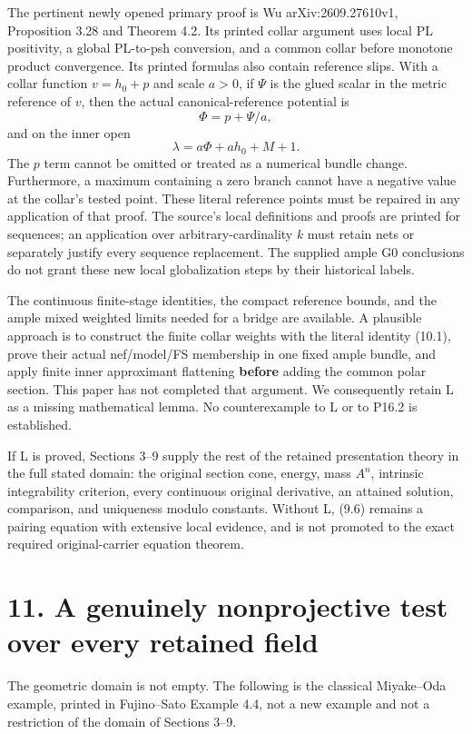 \documentclass[
  10pt,
]{article}
\begin{document}
The pertinent newly opened primary proof is Wu arXiv:2609.27610v1,
Proposition 3.28 and Theorem 4.2. Its printed collar argument uses local
PL positivity, a global PL-to-psh conversion, and a common collar before
monotone product convergence. Its printed formulas also contain
reference slips. With a collar function \(v=h_0+p\) and scale \(a>0\),
if \(\Psi\) is the glued scalar in the metric reference of \(v\), then
the actual canonical-reference potential is \[\Phi=p+\Psi/a,\] and on
the inner open
\[\lambda=a\Phi+a h_0+M+1.                              \tag{10.1}\] The
\(p\) term cannot be omitted or treated as a numerical bundle change.
Furthermore, a maximum containing a zero branch cannot have a negative
value at the collar's tested point. These literal reference points must
be repaired in any application of that proof. The source's local
definitions and proofs are printed for sequences; an application over
arbitrary-cardinality \(k\) must retain nets or separately justify every
sequence replacement. The supplied ample G0 conclusions do not grant
these new local globalization steps by their historical labels.

The continuous finite-stage identities, the compact reference bounds,
and the ample mixed weighted limits needed for a bridge are available. A
plausible approach is to construct the finite collar weights with the
literal identity (10.1), prove their actual nef/model/FS membership in
one fixed ample bundle, and apply finite inner approximant flattening
\textbf{before} adding the common polar section. This paper has not
completed that argument. We consequently retain L as a missing
mathematical lemma. No counterexample to L or to P16.2 is established.

If L is proved, Sections 3--9 supply the rest of the retained
presentation theory in the full stated domain: the original section
cone, energy, mass \(A^n\), intrinsic integrability criterion, every
continuous original derivative, an attained solution, comparison, and
uniqueness modulo constants. Without L, (9.6) remains a pairing equation
with extensive local evidence, and is not promoted to the exact required
original-carrier equation theorem.

\section{11. A genuinely nonprojective test over every retained
field}\label{a-genuinely-nonprojective-test-over-every-retained-field}

The geometric domain is not empty. The following is the classical
Miyake--Oda example, printed in Fujino--Sato Example 4.4, not a new
example and not a restriction of the domain of Sections 3--9.
\end{document}

